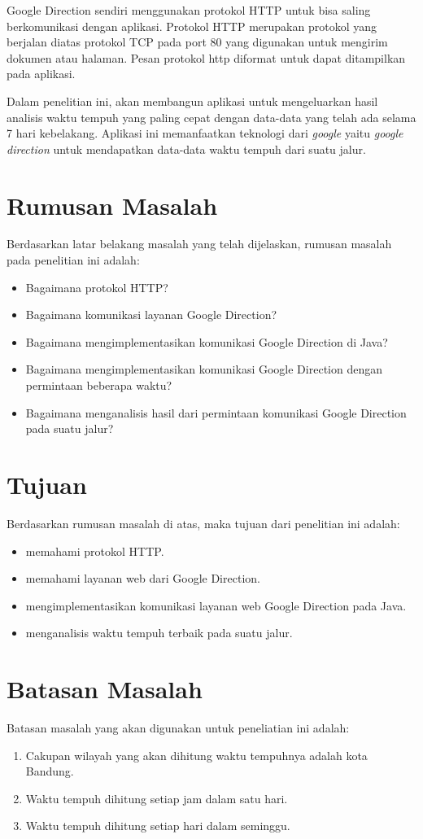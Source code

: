 Google Direction sendiri menggunakan protokol HTTP untuk bisa saling berkomunikasi dengan aplikasi. Protokol HTTP merupakan protokol yang berjalan diatas protokol TCP pada port 80 yang digunakan untuk mengirim dokumen atau halaman. Pesan protokol http diformat untuk dapat ditampilkan pada aplikasi.

Dalam penelitian ini, akan membangun aplikasi untuk mengeluarkan hasil analisis waktu tempuh yang paling cepat dengan data-data yang telah ada selama 7 hari kebelakang. Aplikasi ini memanfaatkan teknologi dari \textit{google} yaitu \textit{google direction} untuk mendapatkan data-data waktu tempuh dari suatu jalur.

\section{Rumusan Masalah}
\label{sec:rumusan}
Berdasarkan latar belakang masalah yang telah dijelaskan, rumusan masalah pada penelitian ini adalah:
\begin{itemize}
	\item Bagaimana protokol HTTP?
	\item Bagaimana komunikasi layanan Google Direction?
	\item Bagaimana mengimplementasikan komunikasi Google Direction di Java?
	\item Bagaimana mengimplementasikan komunikasi Google Direction dengan permintaan beberapa waktu?
	\item Bagaimana menganalisis hasil dari permintaan komunikasi Google Direction pada suatu jalur?
\end{itemize}

\section{Tujuan}
\label{sec:tujuan}
Berdasarkan rumusan masalah di atas, maka tujuan dari penelitian ini adalah:
\begin{itemize}
	\item memahami protokol HTTP.
	\item memahami layanan web dari Google Direction.
	\item mengimplementasikan komunikasi layanan web Google Direction pada Java.
	\item menganalisis waktu tempuh terbaik pada suatu jalur.
\end{itemize}

\section{Batasan Masalah}
\label{sec:batasan}
Batasan masalah yang akan digunakan untuk peneliatian ini adalah:
\begin{enumerate}
	\item Cakupan wilayah yang akan dihitung waktu tempuhnya adalah kota Bandung.
	\item Waktu tempuh dihitung setiap jam dalam satu hari.
	\item Waktu tempuh dihitung setiap hari dalam seminggu.
\end{enumerate}

